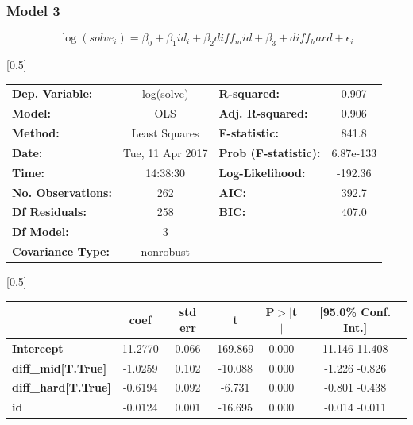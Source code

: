 \documentclass{beamer}
\begin{document}
\begin{frame}

\frametitle{Model 3}

$$
\log(solve_i) = \beta_0 + \beta_1 id_i + \beta_2 diff_mid + \beta_3 + diff_hard + \epsilon_i
$$

\begin{center}
\scalebox{0.5}[0.5]{
\begin{tabular}{lclc}
\toprule
\textbf{Dep. Variable:}    &    log(solve)    & \textbf{  R-squared:         } &     0.907  \\
\textbf{Model:}            &       OLS        & \textbf{  Adj. R-squared:    } &     0.906  \\
\textbf{Method:}           &  Least Squares   & \textbf{  F-statistic:       } &     841.8  \\
\textbf{Date:}             & Tue, 11 Apr 2017 & \textbf{  Prob (F-statistic):} & 6.87e-133  \\
\textbf{Time:}             &     14:38:30     & \textbf{  Log-Likelihood:    } &   -192.36  \\
\textbf{No. Observations:} &         262      & \textbf{  AIC:               } &     392.7  \\
\textbf{Df Residuals:}     &         258      & \textbf{  BIC:               } &     407.0  \\
\textbf{Df Model:}         &           3      & \textbf{                     } &            \\
\textbf{Covariance Type:}  &    nonrobust     & \textbf{                     } &            \\
\bottomrule
\end{tabular}
}
\scalebox{0.5}[0.5]{
\begin{tabular}{lccccc}
\toprule
                           & \textbf{coef} & \textbf{std err} & \textbf{t} & \textbf{P$>$$|$t$|$} & \textbf{[95.0\% Conf. Int.]}  \\
\midrule
\textbf{Intercept}         &      11.2770  &        0.066     &   169.869  &         0.000        &        11.146    11.408       \\
\textbf{diff\_mid[T.True]}  &      -1.0259  &        0.102     &   -10.088  &         0.000        &        -1.226    -0.826       \\
\textbf{diff\_hard[T.True]} &      -0.6194  &        0.092     &    -6.731  &         0.000        &        -0.801    -0.438       \\
\textbf{id}                &      -0.0124  &        0.001     &   -16.695  &         0.000        &        -0.014    -0.011       \\

\end{tabular}}
\end{center}
\end{frame}
\end{document}
